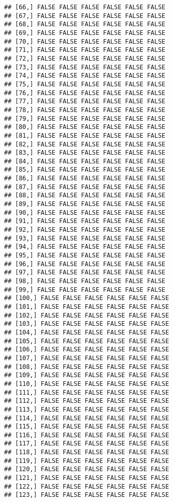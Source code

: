 \documentclass[
]{article}
\begin{document}
\begin{verbatim}
## [66,] FALSE FALSE FALSE FALSE FALSE FALSE
## [67,] FALSE FALSE FALSE FALSE FALSE FALSE
## [68,] FALSE FALSE FALSE FALSE FALSE FALSE
## [69,] FALSE FALSE FALSE FALSE FALSE FALSE
## [70,] FALSE FALSE FALSE FALSE FALSE FALSE
## [71,] FALSE FALSE FALSE FALSE FALSE FALSE
## [72,] FALSE FALSE FALSE FALSE FALSE FALSE
## [73,] FALSE FALSE FALSE FALSE FALSE FALSE
## [74,] FALSE FALSE FALSE FALSE FALSE FALSE
## [75,] FALSE FALSE FALSE FALSE FALSE FALSE
## [76,] FALSE FALSE FALSE FALSE FALSE FALSE
## [77,] FALSE FALSE FALSE FALSE FALSE FALSE
## [78,] FALSE FALSE FALSE FALSE FALSE FALSE
## [79,] FALSE FALSE FALSE FALSE FALSE FALSE
## [80,] FALSE FALSE FALSE FALSE FALSE FALSE
## [81,] FALSE FALSE FALSE FALSE FALSE FALSE
## [82,] FALSE FALSE FALSE FALSE FALSE FALSE
## [83,] FALSE FALSE FALSE FALSE FALSE FALSE
## [84,] FALSE FALSE FALSE FALSE FALSE FALSE
## [85,] FALSE FALSE FALSE FALSE FALSE FALSE
## [86,] FALSE FALSE FALSE FALSE FALSE FALSE
## [87,] FALSE FALSE FALSE FALSE FALSE FALSE
## [88,] FALSE FALSE FALSE FALSE FALSE FALSE
## [89,] FALSE FALSE FALSE FALSE FALSE FALSE
## [90,] FALSE FALSE FALSE FALSE FALSE FALSE
## [91,] FALSE FALSE FALSE FALSE FALSE FALSE
## [92,] FALSE FALSE FALSE FALSE FALSE FALSE
## [93,] FALSE FALSE FALSE FALSE FALSE FALSE
## [94,] FALSE FALSE FALSE FALSE FALSE FALSE
## [95,] FALSE FALSE FALSE FALSE FALSE FALSE
## [96,] FALSE FALSE FALSE FALSE FALSE FALSE
## [97,] FALSE FALSE FALSE FALSE FALSE FALSE
## [98,] FALSE FALSE FALSE FALSE FALSE FALSE
## [99,] FALSE FALSE FALSE FALSE FALSE FALSE
## [100,] FALSE FALSE FALSE FALSE FALSE FALSE
## [101,] FALSE FALSE FALSE FALSE FALSE FALSE
## [102,] FALSE FALSE FALSE FALSE FALSE FALSE
## [103,] FALSE FALSE FALSE FALSE FALSE FALSE
## [104,] FALSE FALSE FALSE FALSE FALSE FALSE
## [105,] FALSE FALSE FALSE FALSE FALSE FALSE
## [106,] FALSE FALSE FALSE FALSE FALSE FALSE
## [107,] FALSE FALSE FALSE FALSE FALSE FALSE
## [108,] FALSE FALSE FALSE FALSE FALSE FALSE
## [109,] FALSE FALSE FALSE FALSE FALSE FALSE
## [110,] FALSE FALSE FALSE FALSE FALSE FALSE
## [111,] FALSE FALSE FALSE FALSE FALSE FALSE
## [112,] FALSE FALSE FALSE FALSE FALSE FALSE
## [113,] FALSE FALSE FALSE FALSE FALSE FALSE
## [114,] FALSE FALSE FALSE FALSE FALSE FALSE
## [115,] FALSE FALSE FALSE FALSE FALSE FALSE
## [116,] FALSE FALSE FALSE FALSE FALSE FALSE
## [117,] FALSE FALSE FALSE FALSE FALSE FALSE
## [118,] FALSE FALSE FALSE FALSE FALSE FALSE
## [119,] FALSE FALSE FALSE FALSE FALSE FALSE
## [120,] FALSE FALSE FALSE FALSE FALSE FALSE
## [121,] FALSE FALSE FALSE FALSE FALSE FALSE
## [122,] FALSE FALSE FALSE FALSE FALSE FALSE
## [123,] FALSE FALSE FALSE FALSE FALSE FALSE

\end{verbatim}
\end{document}
